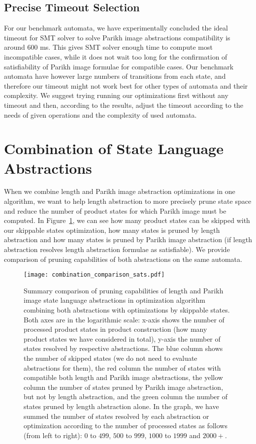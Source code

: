 \subsection{Precise Timeout Selection}

For our benchmark automata, we have experimentally concluded the ideal timeout for SMT solver to solve Parikh image abstractions compatibility is around $600$ ms. This gives SMT solver enough time to compute most incompatible cases, while it does not wait too long for the confirmation of satisfiability of Parikh image formulae for compatible cases. Our benchmark automata have however large numbers of transitions from each state, and therefore our timeout might not work best for other types of automata and their complexity. We suggest trying running our optimizations first without any timeout and then, according to the results, adjust the timeout according to the needs of given operations and the complexity of used automata.

\section{Combination of State Language Abstractions}

When we combine length and Parikh image abstraction optimizations in one algorithm, we want to help length abstraction to more precisely prune state space and reduce the number of product states for which Parikh image must be computed. In Figure~\ref{fig:diagram:combined_sat_unsat_comparison}, we can see how many product states can be skipped with our skippable states optimization, how many states is pruned by length abstraction and how many states is pruned by Parikh image abstraction (if length abstraction resolves length abstraction formulae as satisfiable). We provide comparison of pruning capabilities of both abstractions on the same automata.

\begin{figure}[ht]
	\centering
	\texttt{[image: combination\_comparison\_sats.pdf]}
	\caption{Summary comparison of pruning capabilities of length and Parikh image state language abstractions in optimization algorithm combining both abstractions with optimizations by skippable states. Both axes are in the logarithmic scale: x-axis shows the number of processed product states in product construction (how many product states we have considered in total), y-axis the number of states resolved by respective abstractions. The blue column shows the number of skipped states (we do not need to evaluate abstractions for them), the red column the number of states with compatible both length and Parikh image abstractions, the yellow column the number of states pruned by Parikh image abstraction, but not by length abstraction, and the green column the number of states pruned by length abstraction alone. In the graph, we have summed the number of states resolved by each abstraction or optimization according to the number of processed states as follows (from left to right): $0$ to $499$, $500$ to $999$, $1000$ to $1999$ and $2000+$.}
	\label{fig:diagram:combined_sat_unsat_comparison}
\end{figure}

